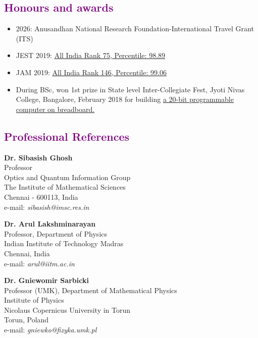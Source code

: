 \documentclass[a4paper,11pt]{article}
\newcommand{\sectionheading}[1]{\subsection*{\textcolor{purple}{#1}}}
\begin{document}
\sectionheading{Honours and awards}
\begin{itemize}[leftmargin=*]
    \item 2026: Anusandhan National Research Foundation-International Travel Grant (ITS)
    \item JEST 2019: \href{https://drive.google.com/file/d/1FfxQB6itaF53i2htbFnjRr7IwUXKcZj7/view?usp=drive_link}{All India Rank 75, Percentile: 98.89}
    \item JAM 2019: \href{https://drive.google.com/file/d/1_0flgwxUQLUjuD20wbk_mOXQ7i0Sz7YF/view?usp=drive_link}{All India Rank 146, Percentile: 99.06}
    \item During BSc, won 1st prize in State level Inter-Collegiate Fest, Jyoti Nivas College, Bangalore, February 2018 for building  \href{https://www.youtube.com/watch?v=04tWPuDVBhs}{a 20-bit programmable computer on breadboard.}
\end{itemize}


\sectionheading{Professional References}

\vspace{0.5cm}
\textbf{ Dr. Sibasish Ghosh} \\
Professor \\
Optics and Quantum Information Group \\
The Institute of Mathematical Sciences \\
Chennai - 600113, India \\
e-mail: \textsl{sibasish@imsc.res.in}





\vspace{0.5cm}
\textbf{Dr. Arul Lakshminarayan} \\
Professor, Department of Physics \\
Indian Institute of Technology Madras \\
Chennai, India \\
e-mail: \textsl{arul@iitm.ac.in}


\vspace{0.5cm}
\textbf{Dr. Gniewomir Sarbicki} \\
Professor (UMK), Department of Mathematical Physics \\
Institute of Physics \\
Nicolaus Copernicus University in Torun \\
Torun, Poland \\
e-mail: \textsl{gniewko@fizyka.umk.pl}

\vspace{0.5cm}
\end{document}
